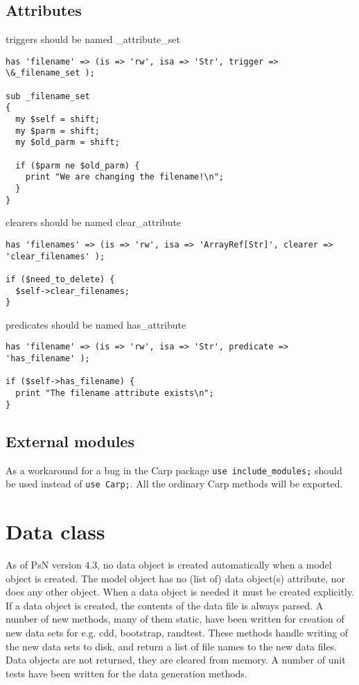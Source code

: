 \subsection{Attributes}
triggers should be named \_attribute\_set
\begin{verbatim}
has 'filename' => (is => 'rw', isa => 'Str', trigger => \&_filename_set );

sub _filename_set
{
  my $self = shift;
  my $parm = shift;
  my $old_parm = shift;

  if ($parm ne $old_parm) {
    print "We are changing the filename!\n";
  }
}
\end{verbatim}

clearers should be named clear\_attribute
\begin{verbatim}
has 'filenames' => (is => 'rw', isa => 'ArrayRef[Str]', clearer => 'clear_filenames' );

if ($need_to_delete) {
  $self->clear_filenames;
}
\end{verbatim}

predicates should be named has\_attribute
\begin{verbatim}
has 'filename' => (is => 'rw', isa => 'Str', predicate => 'has_filename' );

if ($self->has_filename) {
  print "The filename attribute exists\n";
}
\end{verbatim}

\subsection{External modules}

As a workaround for a bug in the Carp package \verb|use include_modules;| should be used instead of \verb|use Carp;|. All the ordinary Carp methods will be exported.


\section{Data class}
As of PsN version 4.3, no data object is created automatically when a model object is created.
The model object has no (list of) data object(s) attribute, nor does any other object.
When a data object is needed it must be created explicitly. If a data object is created, the contents of the
data file is always parsed. A number of new methods, many of them
static, have been written for creation of new data sets for e.g. cdd, bootstrap, randtest. 
These methods handle writing of the new data sets to disk, and return a list of file names to the
new data files. Data objects are not returned, they are cleared from memory. A number of unit tests have been written for
the data generation methods.

